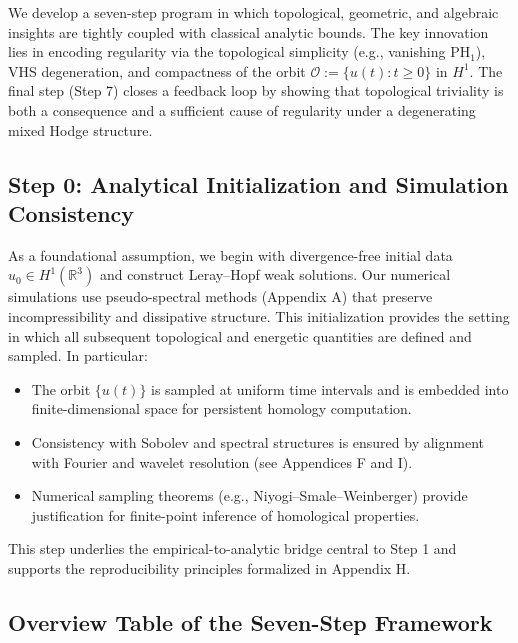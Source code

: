 \documentclass[11pt]{article}
\theoremstyle{definition}
\begin{document}
We develop a seven-step program in which topological, geometric, and algebraic insights are tightly coupled with classical analytic bounds. The key innovation lies in encoding regularity via the topological simplicity (e.g., vanishing $\mathrm{PH}_1$), VHS degeneration, and compactness of the orbit $\mathcal{O} := \{ u(t) : t \ge 0 \}$ in $H^1$. The final step (Step 7) closes a feedback loop by showing that topological triviality is both a consequence and a sufficient cause of regularity under a degenerating mixed Hodge structure.

\subsection*{Step 0: Analytical Initialization and Simulation Consistency}

As a foundational assumption, we begin with divergence-free initial data $u_0 \in H^1(\mathbb{R}^3)$ and construct Leray--Hopf weak solutions. Our numerical simulations use pseudo-spectral methods (Appendix A) that preserve incompressibility and dissipative structure. This initialization provides the setting in which all subsequent topological and energetic quantities are defined and sampled. In particular:
\begin{itemize}
  \item The orbit $\{ u(t) \}$ is sampled at uniform time intervals and is embedded into finite-dimensional space for persistent homology computation.
  \item Consistency with Sobolev and spectral structures is ensured by alignment with Fourier and wavelet resolution (see Appendices F and I).
  \item Numerical sampling theorems (e.g., Niyogi--Smale--Weinberger) provide justification for finite-point inference of homological properties.
\end{itemize}

This step underlies the empirical-to-analytic bridge central to Step 1 and supports the reproducibility principles formalized in Appendix H.

\subsection*{Overview Table of the Seven-Step Framework}
\end{document}
